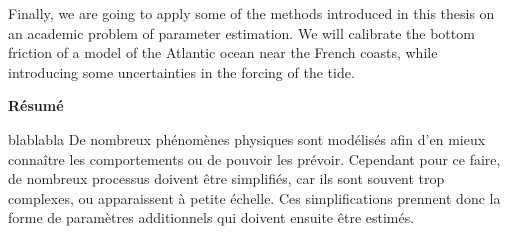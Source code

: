 Finally, we are going to apply some of the methods introduced in this
thesis on an academic problem of parameter estimation. We will
calibrate the bottom friction of a model of the Atlantic ocean near
the French coasts, while introducing some uncertainties in the forcing
of the tide.



%
%
%

\vspace{0.5cm}
\vfill
\etoile
\vfill
\vspace{0.5cm}
\begin{center}
  \bf Résumé
\end{center}
\vspace{0.3cm}
blablabla
De nombreux phénomènes physiques sont modélisés afin
d'en mieux connaître les comportements ou de pouvoir les
prévoir. Cependant pour ce faire, de nombreux processus doivent être
simplifiés, car ils sont souvent trop complexes, ou apparaissent à
petite échelle. Ces simplifications prennent donc la forme de
paramètres additionnels qui doivent ensuite être estimés.

